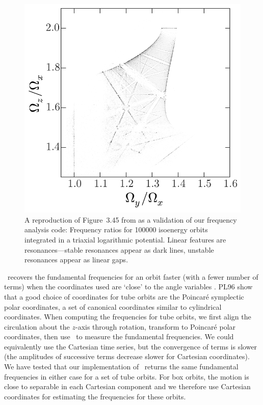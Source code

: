 \setcounter{figure}{0}
\begin{figure}
\begin{center}
\includegraphics[width=\textwidth]{figures/ch3/log-freqmap.pdf}
\caption{ A reproduction of Figure~3.45 from \citep{binneytremaine} as a validation of our frequency analysis code: Frequency ratios for 100000 isoenergy orbits integrated in a triaxial logarithmic potential. Linear features are resonances---stable resonances appear as dark lines, unstable resonances appear as linear gaps.} \label{fig:logfreqs}
\end{center}
\end{figure}

\superfreq\ recovers the fundamental frequencies for an orbit faster (with a fewer number of terms) when the coordinates used are `close' to the angle variables \cite[PL96;][]{papaphilippou96}. PL96 show that a good choice of coordinates for tube orbits are the Poincar\'e symplectic polar coordinates, a set of canonical coordinates similar to cylindrical coordinates. When computing the frequencies for tube orbits, we first align the circulation about the $z$-axis through rotation, transform to Poincar\'e polar coordinates, then use \superfreq\ to measure the fundamental frequencies. We could equivalently use the Cartesian time series, but the convergence of terms is slower (the amplitudes of successive terms decrease slower for Cartesian coordinates). We have tested that our implementation of \superfreq\ returns the same fundamental frequencies in either case for a set of tube orbits. For box orbits, the motion is close to separable in each Cartesian component and we therefore use Cartesian coordinates for estimating the frequencies for these orbits. 

